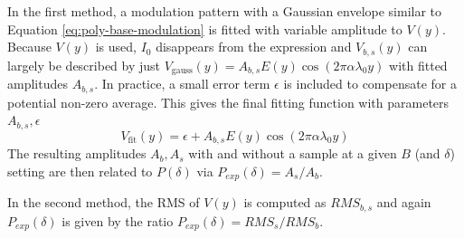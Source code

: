 In the first method, a modulation pattern with a Gaussian envelope similar to Equation \eqref{eq:poly-base-modulation} is fitted with variable amplitude to $V(y)$. Because $V(y)$ is used, $I_0$ disappears from the expression and $V_{b,s}(y)$ can largely be described by just $V_{\text{gauss}}(y) = A_{b,s}E(y)\cos(2\pi\alpha\lambda_0y)$ with fitted amplitudes $A_{b,s}$. In practice, a small error term $\epsilon$ is included to compensate for a potential non-zero average. This gives the final fitting function with parameters $A_{b,s}, \epsilon$
\begin{equation}
	V_{\text{fit}}(y) = \epsilon+ A_{b,s}E(y)\cos(2\pi\alpha\lambda_0y) \label{eq:gauss-fit-function}
\end{equation}
The resulting amplitudes $A_b, A_s$ with and without a sample at a given $B$ (and $\delta$) setting are then related to $P(\delta)$ via $P_{exp}(\delta) = A_s/A_b$. 

In the second method, the RMS of $V(y)$ is computed as $RMS_{b,s}$ and again $P_{exp}(\delta)$ is given by the ratio $P_{exp}(\delta) = RMS_s/RMS_b$.


